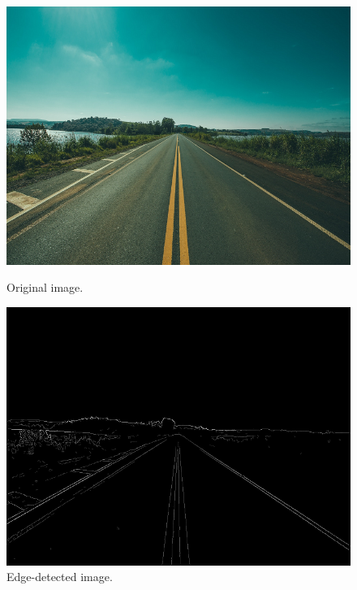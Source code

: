 \documentclass[epsfig,10pt,fullpage]{article}
\begin{document}
~\\
\begin{figure}[h]
\centering
\begin{minipage}[b]{0.32\textwidth}
	\includegraphics[width=\textwidth]{figures/fig_road.png}
	\caption{Original image.}
	\label{fig:road}
\end{minipage}
\hfill
\begin{minipage}[b]{0.32\textwidth}
	\includegraphics[width=\textwidth]{figures/fig_road_edges.png}
	\caption{Edge-detected image.}
	\label{fig:road_edges}
\end{minipage}
\hfill
\begin{minipage}[b]{0.32\textwidth}

\end{minipage}
\end{figure}
\end{document}
